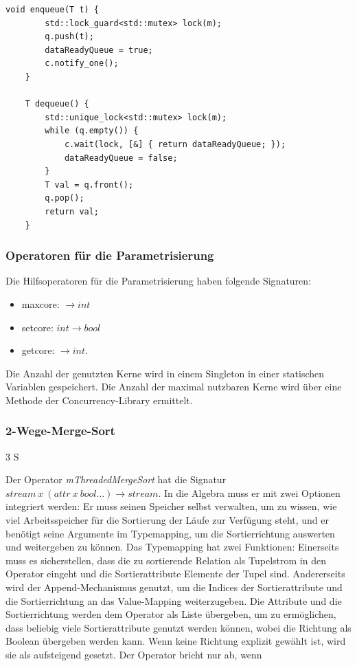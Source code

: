 \documentclass[a4paper,12pt,twoside]{article}
\newcommand{\Fb}[1]{\textit{#1}} %
\begin{document}
{\begin{minipage}{\linewidth}
	\begin{lstlisting}[caption={Enqueue und Dequeue-Methode der threadsichere Warteschlange}, label=list:queue]
	void enqueue(T t) {
		std::lock_guard<std::mutex> lock(m);
		q.push(t);
		dataReadyQueue = true;
		c.notify_one();
	}
	
	T dequeue() {
		std::unique_lock<std::mutex> lock(m);
		while (q.empty()) {
			c.wait(lock, [&] { return dataReadyQueue; });
			dataReadyQueue = false;
		}
		T val = q.front();
		q.pop();
		return val;
	}
	\end{lstlisting}
\end{minipage}

\subsubsection{Operatoren für die Parametrisierung}

Die Hilfsoperatoren für die Parametrisierung haben folgende Signaturen:

\begin{itemize}
	\item maxcore: $\longrightarrow int$
	\item setcore: $int \longrightarrow bool$
	\item getcore: $\longrightarrow int$.
\end{itemize}

Die Anzahl der genutzten Kerne wird in einem Singleton in einer statischen Variablen gespeichert. Die Anzahl der maximal nutzbaren Kerne wird über eine Methode der Concurrency-Library ermittelt.

\subsubsection{2-Wege-Merge-Sort} 3 S

Der Operator \Fb{mThreadedMergeSort} hat die Signatur $stream~x~(attr~x~bool \ldots) \longrightarrow stream$. In die Algebra muss er mit zwei Optionen integriert werden: Er muss seinen Speicher selbst verwalten, um zu wissen, wie viel Arbeitsspeicher für die Sortierung der Läufe zur Verfügung steht, und er benötigt seine Argumente im Typemapping, um die Sortierrichtung auswerten und weitergeben zu können. Das Typemapping hat zwei Funktionen: Einerseits muss es sicherstellen, dass die zu sortierende Relation als Tupelstrom in den Operator eingeht und die Sortierattribute Elemente der Tupel sind. Andererseits wird der Append-Mechanismus genutzt, um die Indices der Sortierattribute und die Sortierrichtung an das Value-Mapping weiterzugeben. Die Attribute und die Sortierrichtung werden dem Operator als Liste übergeben, um zu ermöglichen, dass beliebig viele Sortierattribute genutzt werden können, wobei die Richtung als Boolean übergeben werden kann. Wenn keine Richtung explizit gewählt ist, wird sie als aufsteigend gesetzt. Der Operator bricht nur ab, wenn 

}
\end{document}
